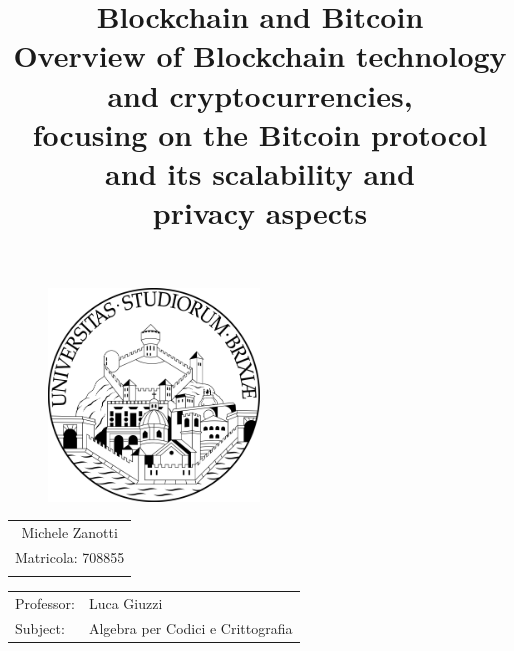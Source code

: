 \documentclass[12pt, a4paper]{article}
\title{
  \textbf{Blockchain and Bitcoin} \\
  \large Overview of Blockchain technology and cryptocurrencies, \\
  focusing on the Bitcoin protocol and its scalability and \\ privacy aspects
}
\date{}
\theoremstyle{definition}
\theoremstyle{remark}
\begin{document}
  \maketitle
  
  \begin{figure}[h!]
		\begin{center}
			\includegraphics[width=0.5\textwidth]{img/1017px-Logo_unibs.png} 
		\end{center}
	\end{figure}
	
	\begin{center}
    
		\begin{tabular}{c}
        	Michele Zanotti\\
        	Matricola: 708855\\
        	\\
        \end{tabular}

        \begin{tabular}{l l}
        	Professor:&  Luca Giuzzi \\
       		Subject:& Algebra per Codici e Crittografia \\ %
        \end{tabular}
		
	\end{center}
    \pagebreak
  
  \tableofcontents

  
  
  
  
  
  

  \printbibliography
\end{document}

